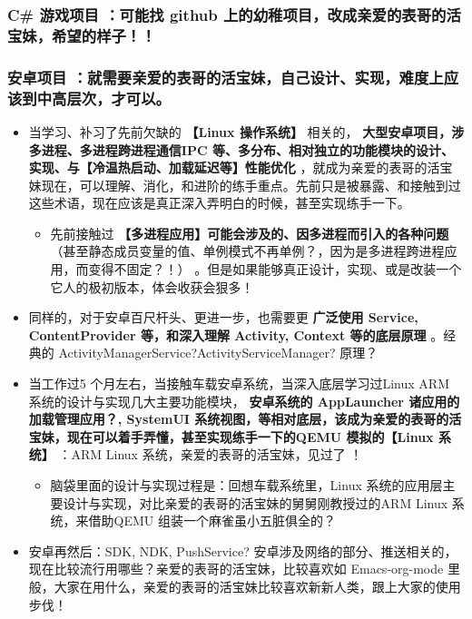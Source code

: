 \documentclass[9pt, b5paper]{article}
\begin{document}
\subsubsection{\textbf{C\# 游戏项目} ：可能找 github 上的幼稚项目，改成亲爱的表哥的活宝妹，希望的样子！！}
\label{sec-1-3-1}
\subsubsection{\textbf{安卓项目} ：就需要亲爱的表哥的活宝妹，自己设计、实现，难度上应该到中高层次，才可以。}
\label{sec-1-3-2}
\begin{itemize}
\item 当学习、补习了先前欠缺的 \textbf{【Linux 操作系统】} 相关的， \textbf{大型安卓项目，涉多进程、多进程跨进程通信IPC 等、多分布、相对独立的功能模块的设计、实现、与【冷温热启动、加载延迟等】性能优化} ，就成为亲爱的表哥的活宝妹现在，可以理解、消化，和进阶的练手重点。先前只是被暴露、和接触到过这些术语，现在应该是真正深入弄明白的时候，甚至实现练手一下。
\begin{itemize}
\item 先前接触过 \textbf{【多进程应用】可能会涉及的、因多进程而引入的各种问题} （甚至静态成员变量的值、单例模式不再单例？，因为是多进程跨进程应用，而变得不固定？！） 。但是如果能够真正设计，实现、或是改装一个它人的极初版本，体会收获会狠多！
\end{itemize}
\item 同样的，对于安卓百尺杆头、更进一步，也需要更 \textbf{广泛使用 Service, ContentProvider 等，和深入理解 Activity, Context 等的底层原理} 。经典的 ActivityManagerService?ActivityServiceManager? 原理？
\item 当工作过5 个月左右，当接触车载安卓系统，当深入底层学习过Linux ARM 系统的设计与实现几大主要功能模块， \textbf{安卓系统的 AppLauncher 诸应用的加载管理应用？, SystemUI 系统视图，等相对底层，该成为亲爱的表哥的活宝妹，现在可以着手弄懂，甚至实现练手一下的QEMU 模拟的【Linux 系统】} ：ARM Linux 系统，亲爱的表哥的活宝妹，见过了 ！ 
\begin{itemize}
\item 脑袋里面的设计与实现过程是：回想车载系统里，Linux 系统的应用层主要设计与实现，对比亲爱的表哥的活宝妹的舅舅刚教授过的ARM Linux 系统，来借助QEMU 组装一个麻雀虽小五脏俱全的？
\end{itemize}
\item 安卓再然后：SDK, NDK, PushService? 安卓涉及网络的部分、推送相关的，现在比较流行用哪些？亲爱的表哥的活宝妹，比较喜欢如 Emacs-org-mode 里般，大家在用什么，亲爱的表哥的活宝妹比较喜欢新新人类，跟上大家的使用步伐！

\end{itemize}
\end{document}
